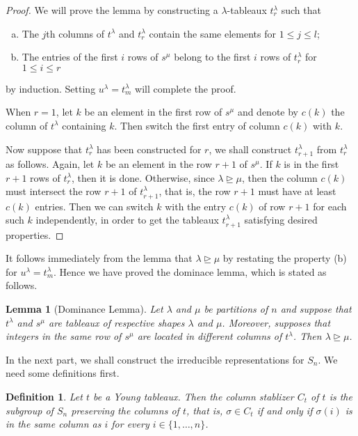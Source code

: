 \documentclass{assignment}[2019/10/15]
\theoremstyle{plain}
\newtheorem{definition}[theorem]{Definition}
\newtheorem{lemma}[theorem]{Lemma}
\begin{document}
    \begin{proof}
        We will prove the lemma by constructing a $\lambda$-tableaux $t_r^\lambda$ such that
        \begin{enumerate}[(a)]
            \item The $j$th columns of $t^\lambda$ and $t_r^\lambda$ contain the same elements for $1\leq j\leq l$;
            \item The entries of the first $i$ rows of $s^\mu$ belong to the first $i$ rows of $t_r^\lambda$ for $1\leq i \leq r$
        \end{enumerate}
        by induction. Setting $u^\lambda = t_m^\lambda$ will complete the proof.

        When $r=1$, let $k$ be an element in the first row of $s^\mu$ and denote by $c(k)$ the column of $t^\lambda$ containing $k$. Then switch the first entry of column $c(k)$ with $k$.

        Now suppose that $t_r^\lambda$ has been constructed for $r$, we shall construct $t_{r+1}^\lambda$ from $t_r^\lambda$ as follows. Again, let $k$ be an element in the row $r+1$ of $s^\mu$. If $k$ is in the first $r+1$ rows of $t_r^\lambda$, then it is done. Otherwise, since $\lambda\unrhd\mu$, then the column $c(k)$ must intersect the row $r+1$ of $t_{r+1}^\lambda$, that is, the row $r+1$ must have at least $c(k)$ entries. Then we can switch $k$ with the entry $c(k)$ of row $r+1$ for each such $k$ independently, in order to get the tableaux $t_{r+1}^\lambda$ satisfying desired properties.
    \end{proof}

    It follows immediately from the lemma that $\lambda\unrhd\mu$ by restating the property (b) for $u^\lambda = t_m^\lambda$. Hence we have proved the dominace lemma, which is stated as follows.

    \begin{lemma}[Dominance Lemma]\label{lem: dom}
        Let $\lambda$ and $\mu$ be partitions of $n$ and suppose that $t^\lambda$ and $s^\mu$ are tableaux of respective shapes $\lambda$ and $\mu$. Moreover, supposes that integers in the same row of $s^\mu$ are located in different columns of $t^\lambda$. Then $\lambda\unrhd\mu$.
    \end{lemma}

    In the next part, we shall construct the irreducible representations for $S_n$. We need some definitions first.

    \begin{definition}
        Let $t$ be a Young tableaux. Then the \emph{column stablizer} $C_t$ of $t$ is the subgroup of $S_n$ preserving the columns of $t$, that is, $\sigma\in C_t$ if and only if $\sigma(i)$ is in the same column as $i$ for every $i\in \{1, \dotsc, n\}$.
    \end{definition}
\end{document}
